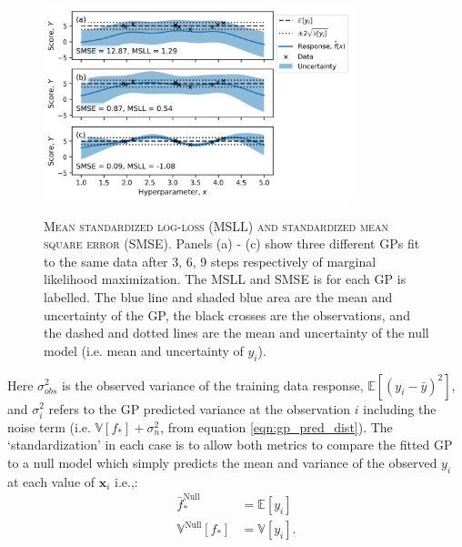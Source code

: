 \begin{figure}
    \centering
    \caption[Mean standardized log-loss (MSLL) and standardized mean square error (SMSE)]{\textsc{Mean standardized log-loss (MSLL) and standardized mean square error (SMSE)}. Panels (a) - (c) show three different GPs fit to the same data after 3, 6, 9 steps respectively of marginal likelihood maximization. The MSLL and SMSE is for each GP is labelled. The blue line and shaded blue area are the mean and uncertainty of the GP, the black crosses are the observations, and the dashed and dotted lines are the mean and uncertainty of the null model (i.e. mean and uncertainty of $y_{i}$).}
    \includegraphics[width=0.8\textwidth]{chapters/msm_optimization/figures/gp_metric_explainer.png}
    \label{fig:msm_gp_metric_explainer}
\end{figure}

Here $\sigma_{obs}^{2}$ is the observed variance of the training data response, $\mathbb{E}\left[(y_{i}-\bar{y})^{2}\right]$, and $\sigma_{i}^{2}$ refers to the GP predicted variance at the observation $i$ including the noise term (i.e. $\mathbb{V}\left[f_{*}\right]+\sigma_{n}^{2}$, from equation \ref{eqn:gp_pred_dist}).  The `standardization' in each case is to allow both metrics to compare the fitted GP to a null model which simply predicts the mean and variance of the observed $y_{i}$ at each value of $\mathbf{x}_{i}$ i.e.,\cite{rasmussenGaussianProcessesMachine2006}:
\begin{equation}\label{eqn:gp_null}
\begin{aligned}
\bar{f}^{\mathrm{Null}}_{*} &= \mathbb{E}\left[y_{i}\right] \\
\mathbb{V}^{\mathrm{Null}}\left[f_{*}\right] &= \mathbb{V}\left[y_{i}\right].
\end{aligned}
\end{equation}

